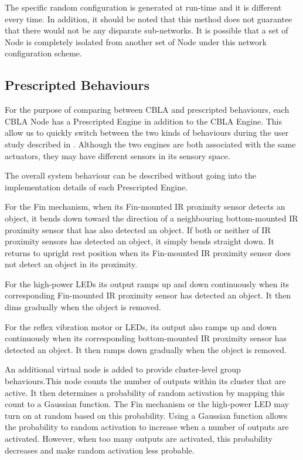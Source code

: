 The specific random configuration is generated at run-time and it is different every time. In addition, it should be noted that this method does not guarantee that there would not be any disparate sub-networks. It is possible that a set of Node is completely isolated from another set of Node under this network configuration scheme.

\subsection{Prescripted Behaviours}\label{sec:prescripted-behaviours}

For the purpose of comparing between CBLA and prescripted behaviours, each CBLA Node has a Prescripted Engine in addition to the CBLA Engine. This allow us to quickly switch between the two kinds of behaviours during the user study described in . Although the two engines are both associated with the same actuators, they may have different sensors in its sensory space. 

The overall system behaviour can be described without going into the implementation details of each Prescripted Engine.

For the Fin mechanism, when its Fin-mounted IR proximity sensor detects an object, it bends down toward the direction of a neighbouring bottom-mounted IR proximity sensor that has also detected an object. If both or neither of IR proximity sensors has detected an object, it simply bends straight down. It returns to upright rest position when its Fin-mounted IR proximity sensor does not detect an object in its proximity.

For the high-power LEDs its output ramps up and down continuously when its corresponding Fin-mounted IR proximity sensor has detected an object. It then dims gradually when the object is removed.

For the reflex vibration motor or LEDs, its output also ramps up and down continuously when its corresponding bottom-mounted IR proximity sensor has detected an object. It then ramps down gradually when the object is removed.

An additional virtual node is added to provide cluster-level group behaviours.This node counts the number of outputs within its cluster that are active. It then determines a probability of random activation by mapping this count to a Gaussian function. The Fin mechanism or the high-power LED may turn on at random based on this probability. Using a Gaussian function allows the probability to random activation to increase when a number of outputs are activated. However, when too many outputs are activated, this probability decreases and make random activation less probable. 


